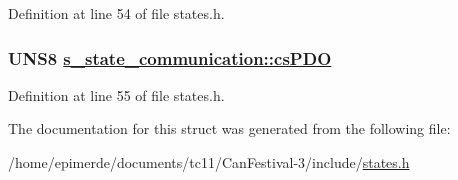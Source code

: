 Definition at line 54 of file states.h.\hypertarget{structs__state__communication_10a8f36d2c3f270feda5f07cf34155d2}{
\subsubsection[csPDO]{\setlength{\rightskip}{0pt plus 5cm}UNS8 \hyperlink{structs__state__communication_10a8f36d2c3f270feda5f07cf34155d2}{s\_\-state\_\-communication::cs\-PDO}}}
\label{structs__state__communication_10a8f36d2c3f270feda5f07cf34155d2}




Definition at line 55 of file states.h.

The documentation for this struct was generated from the following file:\begin{CompactItemize}
\item 
/home/epimerde/documents/tc11/Can\-Festival-3/include/\hyperlink{states_8h}{states.h}\end{CompactItemize}
